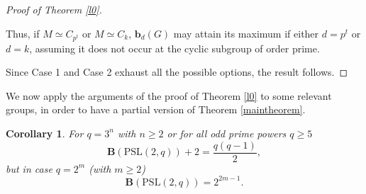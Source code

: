 \documentclass{amsart}
\newtheorem{corollary}[theorem]{Corollary}
\theoremstyle{definition}
\numberwithin{equation}{section}
\begin{document}
\begin{proof}[Proof of Theorem \ref{l0}]
\begin{itemize}
Thus, if $M \simeq C_{p^t}$ or $M \simeq C_k$, $\mathbf{b}_{d}(G)$ may attain its maximum if either $d=p^t$ or $d=k$, assuming it does not occur at the cyclic subgroup of order prime. 
\end{itemize} 
Since Case 1 and Case 2 exhaust all the possible options, the result follows.
\end{proof}

We now  apply the arguments of the proof of Theorem \ref{l0} to some relevant groups, in order to have a partial version of  Theorem \ref{maintheorem}.

\begin{corollary}\label{l1}For $q=3^n$ with $n \ge 2$ or for all odd prime powers $q \ge 5$
 \begin{equation} \label{pslodd}
 \mathbf{B}(\mathrm{PSL}(2,q)) + 2 = \frac{q(q-1)}{2},
 \end{equation} but in case $q=2^m$ (with $m \ge 2$)
 \begin{equation}\mathbf{B}(\mathrm{PSL}(2,q)) = 2^{2m-1}.
 \end{equation}
\end{corollary}
\end{document}
